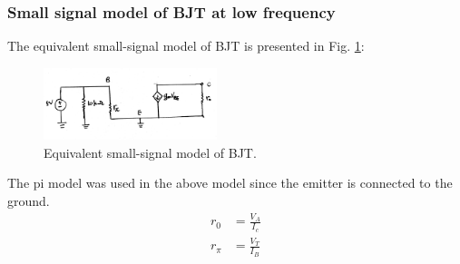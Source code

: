 \documentclass[journal]{IEEEtran}
\begin{document}
\subsubsection{Small signal model of BJT at low frequency}
\par The equivalent small-signal model of BJT is presented in Fig. \ref{scan-2}:
\begin{figure}[h]
  \centering
  \includegraphics[width=0.45\textwidth]{images/scan-2.jpg}
  \caption{Equivalent small-signal model of BJT.}
  \label{scan-2}
\end{figure}
\par The pi model was used in the above model since the emitter is
connected to the ground.
\begin{equation*}
  \begin{split}
    r_{0}&=\frac{V_{A}}{I_{c}}\\
    r_{\pi}&=\frac{V_{T}}{I_{B}}
  \end{split}
\end{equation*}
\end{document}
